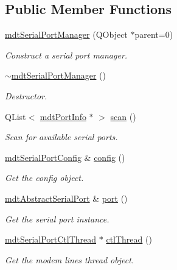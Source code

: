 \subsection*{Public Member Functions}
\begin{DoxyCompactItemize}
\item 
\hyperlink{classmdt_serial_port_manager_a6508372bcab37a73546fc2c24ee6415c}{mdtSerialPortManager} (QObject $\ast$parent=0)
\begin{DoxyCompactList}\small\item\em Construct a serial port manager. \end{DoxyCompactList}\item 
\hyperlink{classmdt_serial_port_manager_abde2c5990f3ec7daf41ebc35b4731c1d}{$\sim$mdtSerialPortManager} ()
\begin{DoxyCompactList}\small\item\em Destructor. \end{DoxyCompactList}\item 
QList$<$ \hyperlink{classmdt_port_info}{mdtPortInfo} $\ast$ $>$ \hyperlink{classmdt_serial_port_manager_a791572f869d1d605d0c4658ca4187260}{scan} ()
\begin{DoxyCompactList}\small\item\em Scan for available serial ports. \end{DoxyCompactList}\item 
\hyperlink{classmdt_serial_port_config}{mdtSerialPortConfig} \& \hyperlink{classmdt_serial_port_manager_a4b8ab7b9d53966a1887d9ce8557b8416}{config} ()
\begin{DoxyCompactList}\small\item\em Get the config object. \end{DoxyCompactList}\item 
\hyperlink{classmdt_abstract_serial_port}{mdtAbstractSerialPort} \& \hyperlink{classmdt_serial_port_manager_aa96937c2123fe4353b948b848d3e064d}{port} ()
\begin{DoxyCompactList}\small\item\em Get the serial port instance. \end{DoxyCompactList}\item 
\hypertarget{classmdt_serial_port_manager_a9dc223afc96ec7b1fce4660ac96a3fe7}{
\hyperlink{classmdt_serial_port_ctl_thread}{mdtSerialPortCtlThread} $\ast$ \hyperlink{classmdt_serial_port_manager_a9dc223afc96ec7b1fce4660ac96a3fe7}{ctlThread} ()}
\label{classmdt_serial_port_manager_a9dc223afc96ec7b1fce4660ac96a3fe7}

\begin{DoxyCompactList}\small\item\em Get the modem lines thread object. \end{DoxyCompactList}\end{DoxyCompactItemize}


